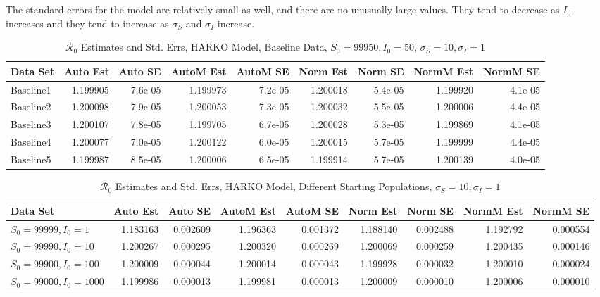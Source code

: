 \documentclass[12pt]{article}
\newcommand{\rr}{\ensuremath{\mathcal{R}_0}}
\begin{document}
The standard errors for the model are relatively small as well, and there are no unusually large values. They tend to decrease as $I_0$ increases and they tend to increase as $\sigma_S$ and $\sigma_I$ increase.

\begin{table}[H]
	
	\caption{$\rr$ Estimates and Std. Errs, HARKO Model, 
		Baseline Data, $S_0 = 99950, I_0 = 50$, 
		$\sigma_S = 10, \sigma_I = 1$}
	\begin{footnotesize}
		\hskip -1cm
	\begin{tabular}{l|r|r|r|r|r|r|r|r}
		\hline
		Data Set & Auto Est & Auto SE & AutoM Est & AutoM SE & Norm Est & Norm SE & NormM Est & NormM SE\\
		\hline
		Baseline1 & 1.199905 & 7.6e-05 & 1.199973 & 7.2e-05 & 1.200018 & 5.4e-05 & 1.199920 & 4.1e-05\\
		\hline
		Baseline2 & 1.200098 & 7.9e-05 & 1.200053 & 7.3e-05 & 1.200032 & 5.5e-05 & 1.200006 & 4.4e-05\\
		\hline
		Baseline3 & 1.200107 & 7.8e-05 & 1.199705 & 6.7e-05 & 1.200028 & 5.3e-05 & 1.199869 & 4.1e-05\\
		\hline
		Baseline4 & 1.200077 & 7.0e-05 & 1.200122 & 6.0e-05 & 1.200015 & 5.7e-05 & 1.199999 & 4.4e-05\\
		\hline
		Baseline5 & 1.199987 & 8.5e-05 & 1.200006 & 6.5e-05 & 1.199914 & 5.7e-05 & 1.200139 & 4.0e-05\\
		\hline
	\end{tabular}
\end{footnotesize}
\end{table}

\begin{table}[H]
	
	\caption{$\rr$ Estimates and Std. Errs, HARKO Model,
		Different Starting Populations, 
		$\sigma_S = 10, \sigma_I = 1$}
	\begin{footnotesize}
		\hskip -1.7cm
	\begin{tabular}{l|r|r|r|r|r|r|r|r}
		\hline
		Data Set & Auto Est & Auto SE & AutoM Est & AutoM SE & Norm Est & Norm SE & NormM Est & NormM SE\\
		\hline
		$S_0 = 99999, I_0 = 1$ & 1.183163 & 0.002609 & 1.196363 & 0.001372 & 1.188140 & 0.002488 & 1.192792 & 0.000554\\
		\hline
		$S_0 = 99990, I_0 = 10$ & 1.200267 & 0.000295 & 1.200320 & 0.000269 & 1.200069 & 0.000259 & 1.200435 & 0.000146\\
		\hline
		$S_0 = 99900, I_0 = 100$ & 1.200009 & 0.000044 & 1.200014 & 0.000043 & 1.199928 & 0.000032 & 1.200010 & 0.000024\\
		\hline
		$S_0 = 99000, I_0 = 1000$ & 1.199986 & 0.000013 & 1.199981 & 0.000013 & 1.200009 & 0.000010 & 1.200006 & 0.000010\\
		\hline
	\end{tabular}
\end{footnotesize}
\end{table}
\end{document}
